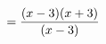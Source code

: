 \documentclass[preview]{standalone}
\begin{document}
\begin{align*}
\special{dvisvgm:raw <g id='unique000'>}=\frac{(x-3)(x+3)}{(x-3)}\special{dvisvgm:raw </g>}
\end{align*}
\end{document}
